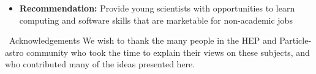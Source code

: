 \begin{itemize}
\item[] {\bf Recommendation:} Provide young scientists with opportunities to learn computing and software skills that are marketable for non-academic jobs
\end{itemize}

\ {Acknowledgements}
We wish to thank the many people in the HEP and Particle-astro
community who took the time to explain their views on these subjects,
and who contributed many of the ideas presented here.

%
%
%

